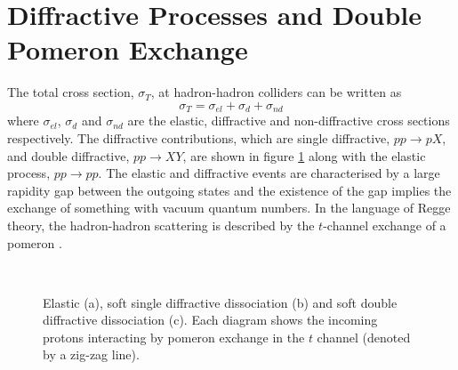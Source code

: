 \section{Diffractive Processes and Double Pomeron Exchange} \label{dpetheory} 


The total cross section, $\sigma_T$, at hadron-hadron colliders can be written as
\begin{equation}
\sigma_T = \sigma_{el} + \sigma_{d} + \sigma_{nd}
\end{equation}
where $\sigma_{el}$, $\sigma_{d}$ and $\sigma_{nd}$ are the elastic, diffractive and non-diffractive cross sections respectively. The diffractive contributions, which are single diffractive, $pp \rightarrow pX$, and double diffractive, $pp \rightarrow XY$, are shown in figure \ref{softpomeron} along with the elastic process, $pp \rightarrow pp$. The elastic and diffractive events are characterised by a large rapidity gap between the outgoing states and the existence of the gap implies the exchange of something with vacuum quantum numbers. In the language of Regge theory, the hadron-hadron scattering is described by the $t$-channel exchange of a pomeron \cite{Arneodo:2005kd}.

\begin{figure} 
\centering
\mbox{
	\quad
	\quad
	}
\caption[Elastic, single diffractive and double diffractive scattering]{Elastic (a), soft single diffractive dissociation (b) and soft double diffractive dissociation (c). Each diagram shows the incoming protons interacting by pomeron exchange in the $t$ channel (denoted by a zig-zag line).\label{softpomeron}}
\end{figure}

